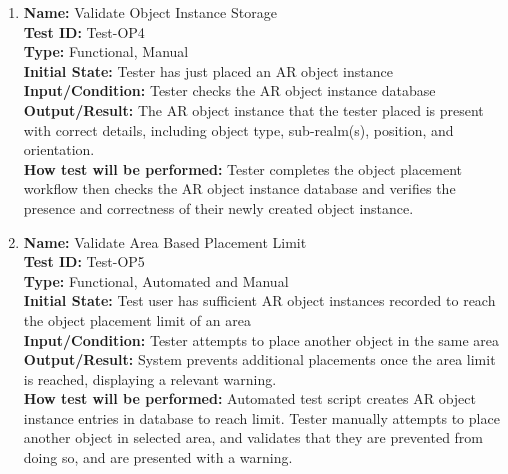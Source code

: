 \documentclass[12pt, titlepage]{article}
\begin{document}
\begin{enumerate}
  \item \textbf{Name:} Validate Object Instance Storage \label{itm:Test-OP4} \\
        \textbf{Test ID:} Test-OP4 \\
        \textbf{Type:} Functional, Manual \\
        \textbf{Initial State:} Tester has just placed an AR object instance \\
        \textbf{Input/Condition:} Tester checks the AR object instance database \\
        \textbf{Output/Result:} The AR object instance that the tester placed is present with correct details, including object type, sub-realm(s), position, and orientation. \\
        \textbf{How test will be performed:} Tester completes the object placement workflow then checks the AR object instance database and verifies the presence and correctness of their newly created object instance.
        
  \item \textbf{Name:} Validate Area Based Placement Limit \label{itm:Test-OP5} \\
        \textbf{Test ID:} Test-OP5 \\
        \textbf{Type:} Functional, Automated and Manual \\
        \textbf{Initial State:} Test user has sufficient AR object instances recorded to reach the object placement limit of an area  \\
        \textbf{Input/Condition:} Tester attempts to place another object in the same area \\
        \textbf{Output/Result:} System prevents additional placements once the area limit is reached, displaying a relevant warning. \\
        \textbf{How test will be performed:} Automated test script creates AR object instance entries in database to reach limit. Tester manually attempts to place another object in selected area, and validates that they are prevented from doing so, and are presented with a warning.


\end{enumerate}
\end{document}

